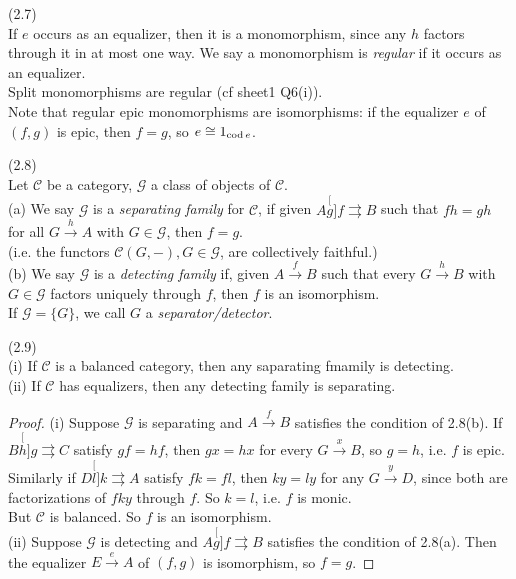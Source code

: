 \documentclass[a4paper]{article}
\begin{document}
\begin{rem} (2.7)\\
    If $e$ occurs as an equalizer, then it is a monomorphism, since any $h$ factors through it in at most one way. We say a monomorphism is \emph{regular} if it occurs as an equalizer.\\
    Split monomorphisms are regular (cf sheet1 Q6(i)).\\
    Note that regular epic monomorphisms are isomorphisms: if the equalizer $e$ of $(f,g)$ is epic, then $f=g$, so $e \cong 1_{\operatorname{cod} e}$.
\end{rem}

\begin{defi} (2.8)\\
    Let $\mathcal{C}$ be a category, $\mathcal{G}$ a class of objects of $\mathcal{C}$.\\
    (a) We say $\mathcal{G}$ is a \emph{separating family} for $\mathcal{C}$, if given $A \stackrel[g]{f}{\rightrightarrows} B$ such that $fh=gh$ for all $G \xrightarrow{h} A$ with $G \in \mathcal{G}$, then $f=g$.\\
    (i.e. the functors $\mathcal{C}(G,-),G \in \mathcal{G}$, are collectively faithful.)\\
    (b) We say $\mathcal{G}$ is a \emph{detecting family} if, given $A \xrightarrow{f} B$ such that every $G \xrightarrow{h} B$ with $G \in \mathcal{G}$ factors uniquely through $f$, then $f$ is an isomorphism.\\
    If $\mathcal{G} =\{G\}$, we call $G$ a \emph{separator/detector}.
\end{defi}

\begin{lemma} (2.9)\\
    (i) If $\mathcal{C}$ is a balanced category, then any saparating fmamily is detecting.\\
    (ii) If $\mathcal{C}$ has equalizers, then any detecting family is separating.
    \begin{proof}
        (i) Suppose $\mathcal{G}$ is separating and $A \xrightarrow{f} B$ satisfies the condition of 2.8(b). If $B \stackrel[h]{g}{\rightrightarrows} C$ satisfy $gf=hf$, then $gx=hx$ for every $G \xrightarrow{x} B$, so $g=h$, i.e. $f$ is epic.\\
        Similarly if $D \stackrel[l]{k}{\rightrightarrows} A$ satisfy $fk=fl$, then $ky=ly$ for any $G \xrightarrow{y} D$, since both are factorizations of $fky$ through $f$. So $k=l$, i.e. $f$ is monic.\\
        But $\mathcal{C}$ is balanced. So $f$ is an isomorphism.\\
        (ii) Suppose $\mathcal{G}$ is detecting and $A \stackrel[g]{f}{\rightrightarrows} B$ satisfies the condition of 2.8(a). Then the equalizer $E \xrightarrow{e} A$ of $(f,g)$ is isomorphism, so $f=g$.
    \end{proof}
\end{lemma}
\end{document}
